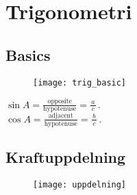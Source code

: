 \section{Trigonometri}
\subsection{Basics}
\begin{figure}
    \texttt{[image: trig\_basic]}
\end{figure}

\begin{math}
	\sin A=\frac{\textrm{opposite}}{\textrm{hypotenuse}}=\frac{a}{\,c\,}\,.
\end{math} \\[2pt]
\begin{math}
	\cos A=\frac{\textrm{adjacent}}{\textrm{hypotenuse}}=\frac{b}{\,c\,}\,.
\end{math} \\[2pt]

\subsection{Kraftuppdelning}

\begin{figure}
    \texttt{[image: uppdelning]}
\end{figure}

